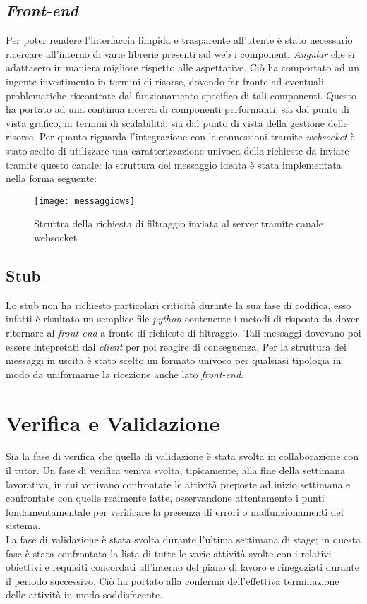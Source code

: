 \subsection{\textit{Front-end}}
Per poter rendere l'interfaccia limpida e trasparente all'utente è stato necessario ricercare all'interno di varie librerie presenti sul web i componenti \textit{Angular} che si adattasero in maniera migliore rispetto alle aspettative. Ciò ha comportato ad un ingente investimento in termini di risorse, dovendo far fronte ad eventuali problematiche riscontrate dal funzionamento specifico di tali componenti. Questo ha portato ad una continua ricerca di componenti performanti, sia dal punto di vista grafico, in termini di scalabilità, sia dal punto di vista della gestione delle risorse.
Per quanto riguarda l'integrazione con le connessioni tramite \textit{websocket} è stato scelto di utilizzare una caratterizzazione univoca della richieste da inviare tramite questo canale: la struttura del messaggio ideata è stata implementata nella forma seguente:
\begin{figure}[!h] 
	\centering 
	\texttt{[image: messaggiows]} 
	\caption{Struttra della richiesta di filtraggio inviata al server tramite canale websocket}
\end{figure}
\subsection{Stub}
Lo stub non ha richiesto particolari criticità durante la sua fase di codifica, esso infatti è risultato un semplice file \textit{python} contenente i metodi di risposta da dover ritornare al \textit{front-end} a fronte di richieste di filtraggio. Tali messaggi dovevano poi essere intepretati dal \textit{client} per poi reagire di conseguenza. Per la struttura dei messaggi in uscita è stato scelto un formato univoco per qualsiasi tipologia in modo da uniformarne la ricezione anche lato \textit{front-end}.
\newpage
\section{Verifica e Validazione}
Sia la fase di verifica che quella di validazione è stata svolta in collaborazione con il tutor. Un fase di verifica veniva svolta, tipicamente, alla fine della settimana lavorativa, in cui venivano confrontate le attività preposte ad inizio settimana e confrontate con quelle realmente fatte, osservandone attentamente i punti fondamentamentale per verificare la presenza di errori o malfunzionamenti del sistema.\\ La fase di validazione è stata svolta durante l'ultima settimana di stage; in questa fase è stata confrontata la lista di tutte le varie attività svolte con i relativi obiettivi e requisiti concordati all'interno del piano di lavoro e rinegoziati durante il periodo successivo. Ciò ha portato alla conferma dell'effettiva terminazione delle attività in modo soddisfacente. 

